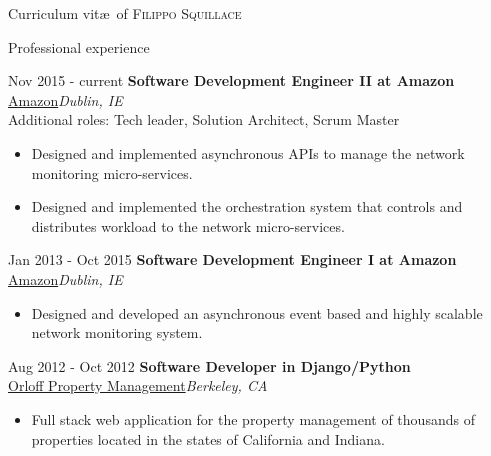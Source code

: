 \documentclass[10pt,a4paper]{article}
\begin{document}
  \begin{cv}{\huge{Curriculum vit\ae~of \textsc{Filippo Squillace}}}
    \bigskip
    \bigskip
    \begin{minipage}[t]{0.7\textwidth}
      \begin{cvlist}{Professional experience}
        \item[\footnotesize{Nov 2015 - current}] \textbf{Software Development Engineer II at Amazon}\\
        \href{http://www.amazon.com}{Amazon}\hfill\textit{Dublin, IE}\\
        Additional roles: Tech leader, Solution Architect, Scrum Master
        \begin{small}
          \begin{itemize}
            \item Designed and implemented asynchronous APIs to manage the network monitoring micro-services.
            \item Designed and implemented the orchestration system that controls and distributes workload to the network micro-services.
          \end{itemize}
        \end{small}
        \item[\footnotesize{Jan 2013 - Oct 2015}] \textbf{Software Development Engineer I at Amazon}\\
        \href{http://www.amazon.com}{Amazon}\hfill\textit{Dublin, IE}
        \begin{small}
          \begin{itemize}
            \item Designed and developed an asynchronous event based and highly scalable network monitoring system.
          \end{itemize}
        \end{small}
        \item[\footnotesize{Aug 2012 - Oct 2012}] \textbf{Software Developer in Django/Python}\\
        \href{http://opmservice.com}{Orloff Property Management}\hfill\textit{Berkeley, CA}
        \begin{small}
          \begin{itemize}
            \item Full stack web application for the property management of
            thousands of properties located in the states
            of California and Indiana.

\end{itemize}
\end{small}
\end{cvlist}
\end{minipage}
\end{cv}
\end{document}
